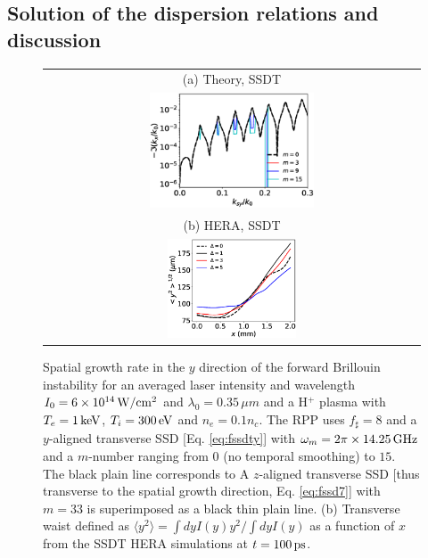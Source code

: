 \documentclass[
 reprint,
 amsmath,amssymb,
 aps,
]{revtex4-1}
\begin{document}
\subsection{Solution of the dispersion relations and discussion }\label{sec:sol}
\begin{figure}
\begin{tabular}{c}
(a) Theory, SSDT \\
\includegraphics[width=0.45\textwidth,trim={-2cm 0 0 0},clip]{SSD_H+1keV300eV.eps}\\
(b) HERA, SSDT \\
\includegraphics[width=0.35\textwidth]{FSBS_SSD_waist_100ps.eps}
\end{tabular}
\caption{ \label{fig:ssdt} 
Spatial growth rate in the $y$ direction of the forward Brillouin instability for an averaged laser intensity and wavelength $I_0=6\times 10^{14}\,\rm W/cm^2$ and  $\lambda_0=0.35\,\mu m$ and a  H$^+$  plasma with $T_e =1\,\rm  keV$, $ T_i=300\,  \rm eV$  and $n_{e}=0.1n_c$.
The RPP uses $f_\sharp = 8$ and a $y$-aligned transverse SSD [Eq. \eqref{eq:fssdty}] with $\omega_m=2\pi \times14.25\,\rm GHz$ and a $m$-number ranging from $0$ (no temporal smoothing) to $15$.
The black plain line corresponds to 
A  $z$-aligned transverse SSD [thus transverse to the spatial growth direction, Eq. \eqref{eq:fssd7}] with $m=33$ is superimposed as a black thin plain line. 
(b) Transverse waist defined as $\langle y^2\rangle=\int dyI(y)y^2 /\int dyI(y)$ as a function of $x$  from the SSDT HERA   simulations at $t=100\,\rm ps$.
}
\end{figure}
\end{document}
